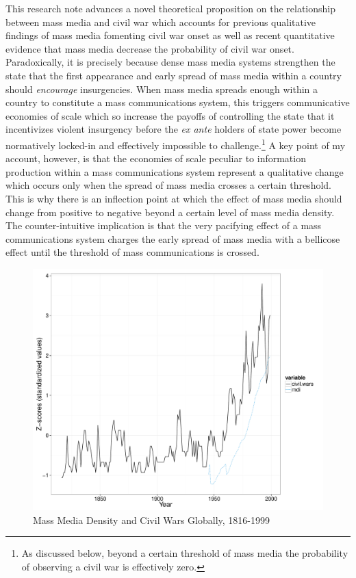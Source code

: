 \documentclass[12pt,article,oneside]{memoir}
\makeatletter
\def\maxwidth{\ifdim\Gin@nat@width>\linewidth\linewidth
\else\Gin@nat@width\fi}
\let\Oldincludegraphics\includegraphics
\renewcommand{\includegraphics}[1]{\Oldincludegraphics[width=\maxwidth]{#1}}
\makeatother
\begin{document}
This research note advances a novel theoretical proposition on the
relationship between mass media and civil war which accounts for
previous qualitative findings of mass media fomenting civil war onset as
well as recent quantitative evidence that mass media decrease the
probability of civil war onset. Paradoxically, it is precisely because
dense mass media systems strengthen the state that the first appearance
and early spread of mass media within a country should \emph{encourage}
insurgencies. When mass media spreads enough within a country to
constitute a mass communications system, this triggers communicative
economies of scale which so increase the payoffs of controlling the
state that it incentivizes violent insurgency before the \emph{ex ante}
holders of state power become normatively locked-in and effectively
impossible to challenge.\footnote{As discussed below, beyond a certain
  threshold of mass media the probability of observing a civil war is
  effectively zero.} A key point of my account, however, is that the
economies of scale peculiar to information production within a mass
communications system represent a qualitative change which occurs only
when the spread of mass media crosses a certain threshold. This is why
there is an inflection point at which the effect of mass media should
change from positive to negative beyond a certain level of mass media
density. The counter-intuitive implication is that the very pacifying
effect of a mass communications system charges the early spread of mass
media with a bellicose effect until the threshold of mass communications
is crossed.

\clearpage
\begin{figure}[htbp]
\centering
\includegraphics{media_civil_war_files/figure-markdown/globalplot.pdf}
\caption{Mass Media Density and Civil Wars Globally, 1816-1999}
\end{figure}
\clearpage
\end{document}
